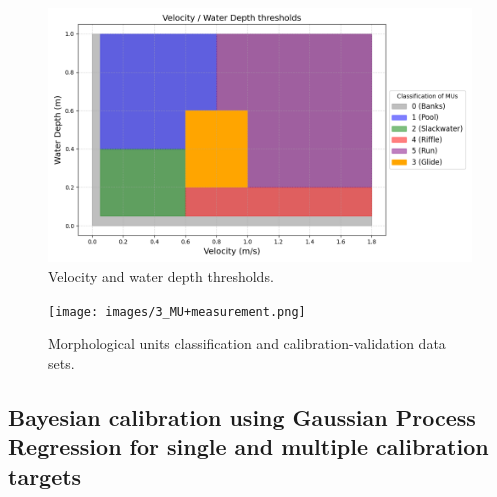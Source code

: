 \documentclass[draft,linenumbers,onecolumn]{agujournal2019} %
\begin{document}

\begin{figure}[!htbp]
	\centering
	\includegraphics[width=5.5in]{images/7_MU_classification.png}
	\caption{Velocity and water depth thresholds.}
	\label{fig:MU_thresholds}
\end{figure}

\begin{figure}[!htbp]
	\centering
	\texttt{[image: images/3\_MU+measurement.png]}
	\caption{Morphological units classification and calibration-validation data sets.}
	\label{fig:MU}
\end{figure}

\subsection{Bayesian calibration using Gaussian Process Regression for single and multiple calibration targets}\label{sec:sec2.6}
\end{document}
